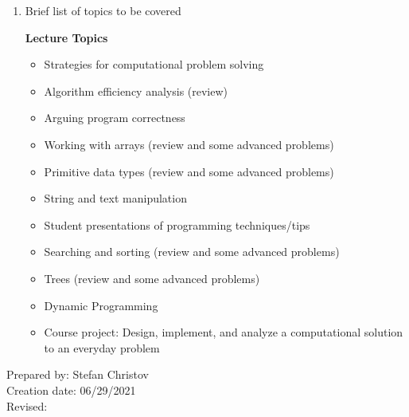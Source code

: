 \begin{enumerate}[1.]
\item Brief list of topics to be covered\\
  {\bfseries
    Lecture Topics
    \begin{itemize}
      \item Strategies for computational problem solving
      \item Algorithm efficiency analysis (review)
      \item Arguing program correctness
      \item Working with arrays (review and some advanced problems)
      \item Primitive data types (review and some advanced problems)
      \item String and text manipulation
      \item Student presentations of programming techniques/tips
      \item Searching and sorting (review and some advanced problems)
      \item Trees (review and some advanced problems)
      \item Dynamic Programming
      \item Course project: Design, implement, and analyze a computational solution to an everyday problem
    \end{itemize}
  }

\end{enumerate}

\noindent Prepared by: Stefan Christov\\
\noindent Creation date: 06/29/2021\\
\noindent Revised:\\
